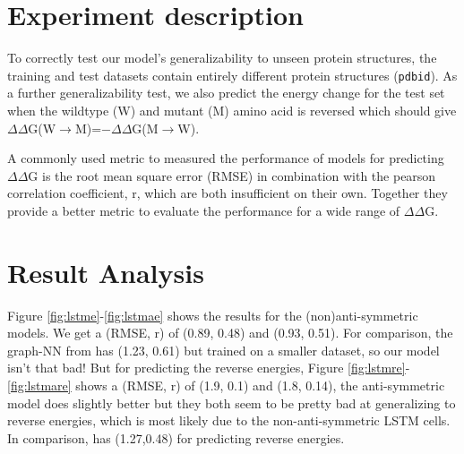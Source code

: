 \documentclass{article}
\newcommand{\dd}{$\Delta\Delta$}
\begin{document}
\section{Experiment description}

To correctly test our model's generalizability to unseen protein structures, the training and test datasets contain entirely different protein structures (\texttt{pdbid}). As a further generalizability test, we also predict the energy change for the test set when the wildtype (W) and mutant (M) amino acid is reversed which should give \dd G(W$\rightarrow$M)=$-$\dd G(M$\rightarrow$W).

A commonly used metric to measured the performance of models for predicting \dd G is the root mean square error (RMSE) in combination with the pearson correlation coefficient, r, which are both insufficient on their own. Together they provide a better metric to evaluate the performance for a wide range of \dd G.

\section{Result Analysis}

Figure \ref{fig:lstme}-\ref{fig:lstmae} shows the results for the (non)anti-symmetric models. We get a (RMSE, r) of (0.89, 0.48) and (0.93, 0.51). For comparison, the graph-NN from \citep{Wang2021} has (1.23, 0.61) but trained on a smaller dataset, so our model isn't that bad! But for predicting the reverse energies, Figure \ref{fig:lstmre}-\ref{fig:lstmare} shows a (RMSE, r) of (1.9, 0.1) and (1.8, 0.14), the anti-symmetric model does slightly better but they both seem to be pretty bad at generalizing to reverse energies, which is most likely due to the non-anti-symmetric LSTM cells. In comparison, \citep{Wang2021} has (1.27,0.48) for predicting reverse energies.
\end{document}
